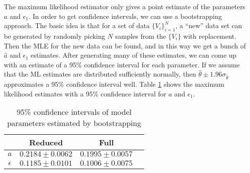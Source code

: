 The maximum likelihood estimator only gives a point estimate of the
parameters $a$ and $\epsilon_1$. In order to get confidence intervals,
we can use a bootstrapping approach. The basic idea is that for a set
of data $\{V_i\}_{i=1}^N$, a ``new'' data set can be generated by
randomly picking $N$ samples from the $\{V_i\}$ with replacement. Then
the MLE for the new data can be found, and in this way we get a bunch
of $\hat{a}$ and $\hat{\epsilon_1}$ estimates. After generating many
of these estimates, we can come up with an estimate of a 95\%
confidence interval for each parameter. If we assume that the ML
estimates are distributed sufficiently normally, then
$\hat{\theta} \pm 1.96 \sigma_{\hat{\theta}}$ approximates a 95\%
confidence interval well. Table \ref{tab:conf-int} shows the maximum
likelihood estimates with a 95\% confidence interval for $a$ and
$\epsilon_1$. 

\begin{table}
  \centering
  \begin{tabular}{cccc}
    \toprule
    & Reduced & Full \\
    \midrule
    $a$  & $0.2184 \pm 0.0062$ & $0.1995 \pm 0.0057$ \\
    $\epsilon$ & $0.1185 \pm 0.0101$ & $0.1006 \pm 0.0075$ \\
    \bottomrule
  \end{tabular}
  \caption[Parameter confidence intervals]{95\% confidence intervals
    of model parameters estimated by bootstrapping}
  \label{tab:conf-int}
\end{table}

